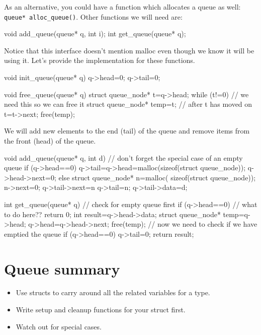 As an alternative, you could have a function which allocates a queue as well: \lstinline!queue* alloc_queue()!.
Other functions we will need are:
\begin{codeinline}
void add_queue(queue* q, int i);
int get_queue(queue* q);
\end{codeinline}

Notice that this interface doesn't mention malloc even though we know it will be using it.
Let's provide the implementation for these functions.
\begin{codeblock}
void init_queue(queue* q) {
    q->head=0;
    q->tail=0;
}

void free_queue(queue* q) {
    struct queue_node* t=q->head;
    while (t!=0) {
	    // we need this so we can free it
        struct queue_node* temp=t; // after t has moved on
        t=t->next;		
        free(temp);
    }
}
\end{codeblock}

We will add new elements to the end (tail) of the queue and remove items from the front (head) of the queue.
\begin{codeblock}
void add_queue(queue* q, int d) {
      // don't forget the special case of an empty queue
    if (q->head==0) {	
        q->tail=q->head=malloc(sizeof(struct queue_node));
        q->head->next=0;
    } else {
	struct queue_node* n=malloc(
	    sizeof(struct queue_node));
	n->next=0;
	q->tail->next=n
	q->tail=n;
    }
    q->tail->data=d;
}

int get_queue(queue* q) {
	// check for empty queue first
    if (q->head==0) {
	  // what to do here??
	return 0;
    }
    int result=q->head->data;
    struct queue_node* temp=q->head;
    q->head=q->head->next;
    free(temp);
      // now we need to check if we have emptied the queue
    if (q->head==0) {
        q->tail=0;
    }
    return result;
}

\end{codeblock}









\section*{Queue summary}
\begin{itemize}
 \item Use structs to carry around all the related variables for a type.
 \item Write setup and cleanup functions for your struct first.
 \item Watch out for special cases.
\end{itemize}
